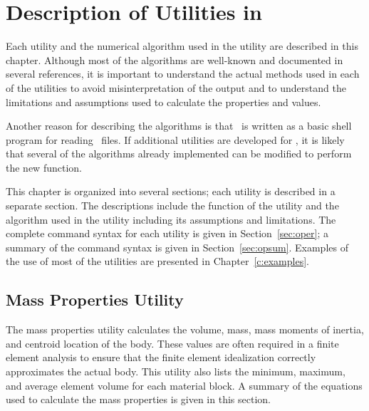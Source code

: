 \chapter{Description of Utilities in \numbers}
\label{c:numerics}

Each utility and the numerical algorithm used in the utility are
described in this chapter. Although most of the algorithms are
well-known and documented in several references, it is important to
understand the actual methods used in each of the utilities to avoid
misinterpretation of the output and to understand the limitations and
assumptions used to calculate the properties and values. 

Another reason for describing the algorithms is that \numbers\ is
written as a basic shell program for reading \exo\ files.  If additional
utilities are developed for \numbers, it is likely that several of the
algorithms already implemented can be modified to perform the new
function. 

This chapter is organized into several sections; each utility is
described in a separate section.  The descriptions include the function
of the utility and the algorithm used in the utility including its
assumptions and limitations.  The complete command syntax for each
utility is given in Section~\ref{sec:oper}; a summary of the command
syntax is given in Section~\ref{sec:opsum}.  Examples of the use of most
of the utilities are presented in Chapter~\ref{c:examples}. 

\section{Mass Properties Utility}\label{sec:mass}

The mass properties utility calculates the volume, mass, mass moments of
inertia, and centroid location of the body.  These values are often
required in a finite element analysis to ensure that the finite element
idealization correctly approximates the actual body.  This utility also
lists the minimum, maximum, and average element volume for each material
block.  A summary of the equations used to calculate the mass properties
is given in this section. 

